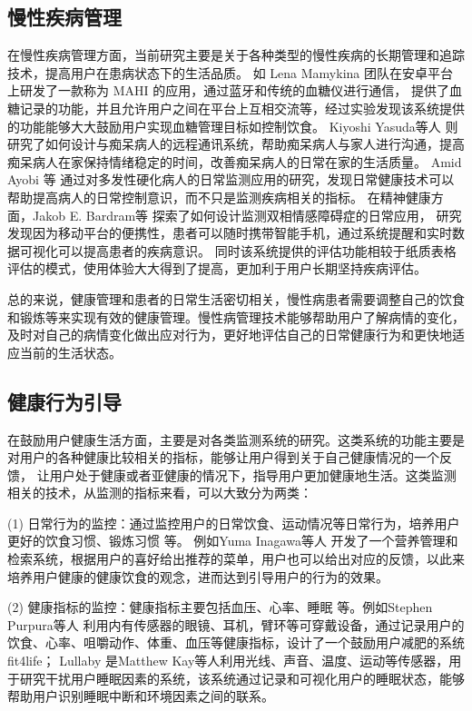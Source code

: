 \subsection{慢性疾病管理}
在慢性疾病管理方面，当前研究主要是关于各种类型的慢性疾病的长期管理和追踪技术，提高用户在患病状态下的生活品质。
如 Lena Mamykina \cite{mamykina2008mahi:}团队在安卓平台上研发了一款称为 MAHI 的应用，通过蓝牙和传统的血糖仪进行通信，
提供了血糖记录的功能，并且允许用户之间在平台上互相交流等，经过实验发现该系统提供的功能能够大大鼓励用户实现血糖管理目标如控制饮食。
Kiyoshi Yasuda等人 \cite{yasuda2009remote}则研究了如何设计与痴呆病人的远程通讯系统，帮助痴呆病人与家人进行沟通，提高痴呆病人在家保持情绪稳定的时间，改善痴呆病人的日常在家的生活质量。
Amid Ayobi 等\cite{ayobi2017quantifying} 通过对多发性硬化病人的日常监测应用的研究，发现日常健康技术可以帮助提高病人的日常控制意识，而不只是监测疾病相关的指标。
在精神健康方面，Jakob E. Bardram等 \cite{bardram2013designing}探索了如何设计监测双相情感障碍症的日常应用， 研究发现因为移动平台的便携性，患者可以随时携带智能手机，通过系统提醒和实时数据可视化可以提高患者的疾病意识。
同时该系统提供的评估功能相较于纸质表格评估的模式，使用体验大大得到了提高，更加利于用户长期坚持疾病评估。

总的来说，健康管理和患者的日常生活密切相关，慢性病患者需要调整自己的饮食和锻炼等来实现有效的健康管理\cite{nunes2018understanding}。慢性病管理技术能够帮助用户了解病情的变化，及时对自己的病情变化做出应对行为，更好地评估自己的日常健康行为和更快地适应当前的生活状态\cite{ayobi2017quantifying}。


\subsection{健康行为引导}
在鼓励用户健康生活方面，主要是对各类监测系统的研究。这类系统的功能主要是对用户的各种健康比较相关的指标，能够让用户得到关于自己健康情况的一个反馈，
让用户处于健康或者亚健康的情况下，指导用户更加健康地生活。这类监测相关的技术，从监测的指标来看，可以大致分为两类：

(1) 日常行为的监控：通过监控用户的日常饮食、运动情况等日常行为，培养用户更好的饮食习惯、锻炼习惯\cite{purpura2011fit4life} \cite{Inagawa2013A} \cite{bravata2007using} \cite{cordeiro2015barriers} \cite{lin2006fish} \cite{miller2014stepstream}等。 例如Yuma Inagawa等人  \cite{Inagawa2013A} 开发了一个营养管理和检索系统，根据用户的喜好给出推荐的菜单，用户也可以给出对应的反馈，以此来培养用户健康的健康饮食的观念，进而达到引导用户的行为的效果。


(2) 健康指标的监控：健康指标主要包括血压、心率、睡眠\cite{kay2012lullaby} \cite{gronvall2013beyond} \cite{logan2007mobile} \cite{walters2010a}等。例如Stephen Purpura等人 \cite{purpura2011fit4life} 利用内有传感器的眼镜、耳机，臂环等可穿戴设备，通过记录用户的饮食、心率、咀嚼动作、体重、血压等健康指标，设计了一个鼓励用户减肥的系统 fit4life； Lullaby  \cite{kay2012lullaby} 是Matthew Kay等人利用光线、声音、温度、运动等传感器，用于研究干扰用户睡眠因素的系统，该系统通过记录和可视化用户的睡眠状态，能够帮助用户识别睡眠中断和环境因素之间的联系。 

